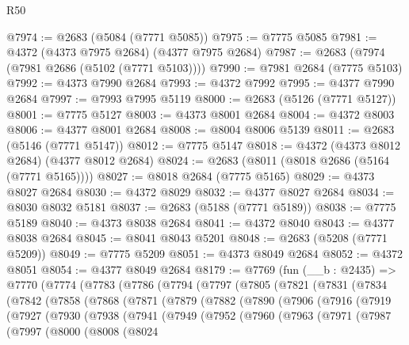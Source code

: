 \begin{lexlean}{R50}
\begin{coremodule}
@7974 := @2683 (@5084 (@7771 @5085))
@7975 := @7775 @5085
@7981 := @4372 (@4373 @7975 @2684) (@4377 @7975 @2684)
@7987 := @2683 (@7974 (@7981 @2686 (@5102 (@7771 @5103))))
@7990 := @7981 @2684 (@7775 @5103)
@7992 := @4373 @7990 @2684
@7993 := @4372 @7992
@7995 := @4377 @7990 @2684
@7997 := @7993 @7995 @5119
@8000 := @2683 (@5126 (@7771 @5127))
@8001 := @7775 @5127
@8003 := @4373 @8001 @2684
@8004 := @4372 @8003
@8006 := @4377 @8001 @2684
@8008 := @8004 @8006 @5139
@8011 := @2683 (@5146 (@7771 @5147))
@8012 := @7775 @5147
@8018 := @4372 (@4373 @8012 @2684) (@4377 @8012 @2684)
@8024 := @2683 (@8011 (@8018 @2686 (@5164 (@7771 @5165))))
@8027 := @8018 @2684 (@7775 @5165)
@8029 := @4373 @8027 @2684
@8030 := @4372 @8029
@8032 := @4377 @8027 @2684
@8034 := @8030 @8032 @5181
@8037 := @2683 (@5188 (@7771 @5189))
@8038 := @7775 @5189
@8040 := @4373 @8038 @2684
@8041 := @4372 @8040
@8043 := @4377 @8038 @2684
@8045 := @8041 @8043 @5201
@8048 := @2683 (@5208 (@7771 @5209))
@8049 := @7775 @5209
@8051 := @4373 @8049 @2684
@8052 := @4372 @8051
@8054 := @4377 @8049 @2684
@8179 := @7769
    (fun (__b : @2435) =>
    @7770
      (@7774
        (@7783
          (@7786
            (@7794
              (@7797
                (@7805
                  (@7821
                    (@7831
                      (@7834
                        (@7842
                          (@7858
                            (@7868
                              (@7871
                                (@7879
                                  (@7882
                                    (@7890
                                      (@7906
                                        (@7916
                                          (@7919
                                            (@7927
                                              (@7930
                                                (@7938
                                                  (@7941
                                                    (@7949
                                                      (@7952
                                                        (@7960
                                                          (@7963
                                                            (@7971
                                                              (@7987
                                                                (@7997
                                                                  (@8000
                                                                    (@8008
                                                                      (@8024

\end{coremodule}
\end{lexlean}
